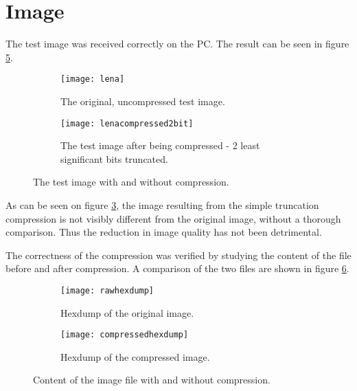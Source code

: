 \section{Image}

The test image was received correctly on the PC. 
The result can be seen in figure \ref{fig:compressedlena}.

\begin{figure}[H]
\centering
\begin{subfigure}{.5\textwidth}
  \centering
  \texttt{[image: lena]}
  \caption{The original, uncompressed test image.}
  \label{fig:lena}
\end{subfigure}%
\begin{subfigure}{.5\textwidth}
  \centering
  \texttt{[image: lenacompressed2bit]}
  \caption{The test image after being  compressed - 2 least significant bits truncated.}
  \label{fig:compressedlena}
\end{subfigure}
\caption{The test image with and without compression.}
\label{fig:lenacomp}
\end{figure}

As can be seen on figure \ref{fig:lenacomp}, the image resulting from the simple truncation compression is not visibly different from the original image, without a thorough comparison. 
Thus the reduction in image quality has not been detrimental.

The correctness of the compression was verified by studying the content of the file before and after compression. 
A comparison of the two files are shown in figure \ref{fig:hexlenacomp}. 

\begin{figure}[H]
\centering
\begin{subfigure}{.5\textwidth}
  \centering
  \texttt{[image: rawhexdump]}
  \caption{Hexdump of the original image.}
  \label{fig:lena}
\end{subfigure}%
\begin{subfigure}{.5\textwidth}
  \centering
  \texttt{[image: compressedhexdump]}
  \caption{Hexdump of the compressed image.}
  \label{fig:compressedlena}
\end{subfigure}
\caption{Content of the image file with and without compression.}
\label{fig:hexlenacomp}
\end{figure}

